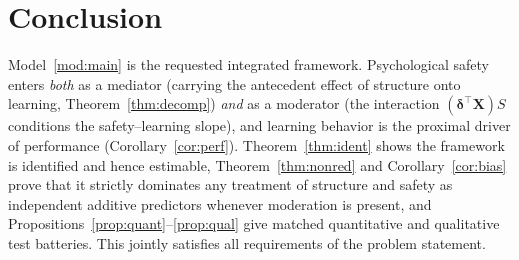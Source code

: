 \documentclass{amsart}
\theoremstyle{definition}
\theoremstyle{plain}
\begin{document}
\section{Conclusion}

Model~\ref{mod:main} is the requested integrated framework. Psychological safety enters
\emph{both} as a mediator (carrying the antecedent effect of structure onto learning,
Theorem~\ref{thm:decomp}) \emph{and} as a moderator (the interaction $(\bm\delta^\top\bm X)S$
conditions the safety--learning slope), and learning behavior is the proximal driver of
performance (Corollary~\ref{cor:perf}). Theorem~\ref{thm:ident} shows the framework is
identified and hence estimable, Theorem~\ref{thm:nonred} and Corollary~\ref{cor:bias} prove
that it strictly dominates any treatment of structure and safety as independent additive
predictors whenever moderation is present, and Propositions~\ref{prop:quant}--\ref{prop:qual}
give matched quantitative and qualitative test batteries. This jointly satisfies all
requirements of the problem statement.
\end{document}
